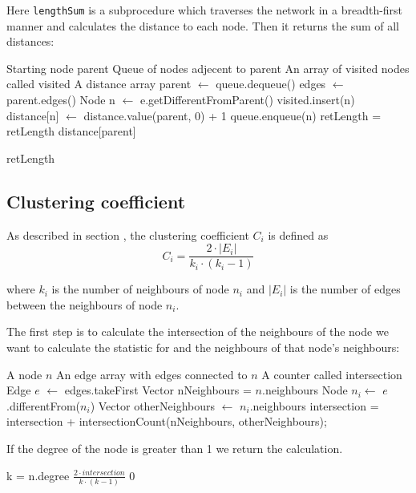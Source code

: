 \documentclass[a4paper,11pt,titlepage]{article}
\newcommand{\code}[1]{\texttt{#1}}
\begin{document}
Here \code{lengthSum} is a subprocedure which traverses the network in a
breadth-first manner and calculates the distance to each node.
Then it returns the sum of all distances:

\begin{algorithmic}
  \REQUIRE Starting node parent
  \REQUIRE Queue of nodes adjecent to parent
  \REQUIRE An array of visited nodes called visited
  \REQUIRE A distance array
    \STATE parent $\gets$ queue.dequeue()
    \STATE edges $\gets$ parent.edges()
    \STATE Node n $\gets$ e.getDifferentFromParent()
        \STATE visited.insert(n)
        \STATE distance[n] $\gets$ distance.value(parent, 0) + 1
        \STATE queue.enqueue(n)
      \ENDIF
    \ENDFOR
    \STATE retLength = retLength distance[parent]
  \ENDWHILE

  \RETURN retLength
\end{algorithmic}


\subsection{Clustering coefficient}
As described in section \label{sec:clusteringcoefficient}, the
clustering coefficient $C_i$ is defined as
\[ C_i = \frac{2 \cdot |E_i|}{k_i \cdot (k_i-1)} \]

where $k_i$ is the number of neighbours of node $n_i$ and $|E_i|$ is
the number of edges between the neighbours of node $n_i$.

The first step is to calculate the intersection of the neighbours
of the node we want to calculate the statistic for and the
neighbours of that node's neighbours:

\begin{algorithmic}
  \REQUIRE A node $n$
  \REQUIRE An edge array with edges connected to $n$
  \REQUIRE A counter called intersection
    \STATE Edge $e$ $\gets$ edges.takeFirst
    \STATE Vector nNeighbours = $n$.neighbours
    \STATE Node $n_i \gets$ $e$.differentFrom($n_i$)
    \STATE Vector otherNeighbours $\gets$ $n_i$.neighbours
    \STATE intersection = intersection + intersectionCount(nNeighbours, otherNeighbours);
  \ENDWHILE
\end{algorithmic}

If the degree of the node is greater than 1 we return the calculation.

\begin{algorithmic}
  \REQUIRE k = n.degree
    \RETURN $\frac{2 \cdot intersection}{k \cdot (k-1)}$
  \ELSE
    \RETURN $0$
  \ENDIF
\end{algorithmic}
\end{document}
